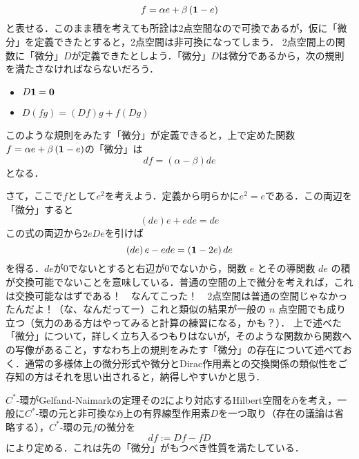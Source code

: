 \[f=\alpha e+\beta \left({\bf 1}-e\right)\]
と表せる．このまま積を考えても所詮は2点空間なので可換であるが，仮に「微分」を定義できたとすると，2点空間は非可換になってしまう．
2点空間上の関数に「微分」$D$が定義できたとしよう．「微分」$D$は微分であるから，次の規則を満たさなければならないだろう．
\begin{itemize}
\item$D{\bf 1}={\bf 0}$
\item$D(fg)=\left(Df\right)g+f\left(Dg\right)$
\end{itemize}
このような規則をみたす「微分」が定義できると，上で定めた関数$f=\alpha e+\beta \left({\bf 1}-e\right)$の「微分」は
\[df=\left(\alpha-\beta\right)de\]
となる．

さて，ここで$f$として$e^2$を考えよう．定義から明らかに$e^2=e$である．この両辺を「微分」すると
\[\left(de\right)e+ede=de\] %
この式の両辺から$2eDe$を引けば
\[\left(de\right)e-ede=\left({\bf 1}-2e\right)de\]
を得る．$de$が0でないとすると右辺が$0$でないから，関数 $e$ とその導関数 $de$ の積が交換可能でないことを意味している．普通の空間の上で微分を考えれば，これは交換可能なはずである！　なんてこった！　2点空間は普通の空間じゃなかったんだよ！（な、なんだってー）これと類似の結果が一般の $n$ 点空間でも成り立つ（気力のある方はやってみると計算の練習になる，かも？）．
上で述べた「微分」について，詳しく立ち入るつもりはないが，そのような関数から関数への写像があること，すなわち上の規則をみたす「微分」の存在について述べておく．通常の多様体上の微分形式や微分とDirac作用素との交換関係の類似性をご存知の方はそれを思い出されると，納得しやすいかと思う．

$C^*$-環がGelfand-Naimarkの定理その2により対応するHilbert空間を$\mathfrak{H}$を考え，一般に$C^*$-環の元と非可換な$\mathfrak{H}$上の有界線型作用素$D$を一つ取り（存在の議論は省略する），$C^*$-環の元$f$の微分を
\[df:=Df-fD\]
により定める．これは先の「微分」がもつべき性質を満たしている．

